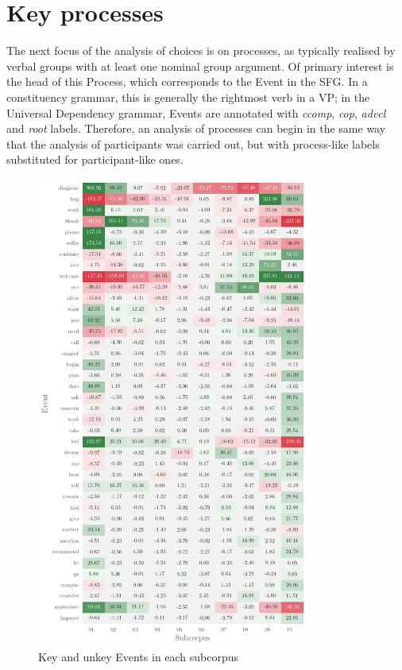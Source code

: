 
\section{Key processes} 

The next focus of the analysis of  choices is on processes, as typically realised by verbal groups with at least one nominal group argument. Of primary interest is the head of this Process, which corresponds to the Event in the \gls{SFG}. In a constituency grammar, this is generally the rightmost verb in a VP; in the Universal Dependency grammar, Events are annotated with \emph{ccomp}, \emph{cop}, \emph{advcl} and \emph{root} labels. Therefore, an analysis of processes can begin in the same way that the analysis of participants was carried out, but with process\hyp{}like labels substituted for participant\hyp{}like ones.

\begin{figure}
    \includegraphics[width=0.80\textwidth]{../images/event-heatmap.png}
    \hspace{1.6cm}
    \caption{Key and unkey Events in each subcorpus}
    \label{fig:event_heatmap}
    \end{figure}

